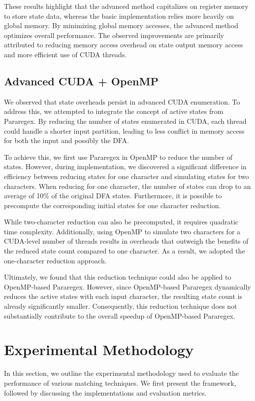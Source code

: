 \documentclass[sigconf]{acmart}
\begin{document}
These results highlight that the advanced method capitalizes on register memory to store state data, whereas the basic implementation relies more heavily on global memory. By  minimizing global memory accesses, the advanced method optimizes overall performance. The observed improvements are primarily attributed to reducing memory access overhead on state output memory access and more efficient use of CUDA threads.

\subsection{Advanced CUDA + OpenMP}
We observed that state overheads persist in advanced CUDA enumeration. To address this, we attempted to integrate the concept of active states from Pararegex\cite{pararegex}. By reducing the number of states enumerated in CUDA, each thread could handle a shorter input partition, leading to less conflict in memory access for both the input and possibly the DFA.

To achieve this, we first use Pararegex in OpenMP to reduce the number of states. However, during implementation, we discovered a significant difference in efficiency between reducing states for one character and simulating states for two characters. When reducing for one character, the number of states can drop to an average of 10\% of the original DFA states. Furthermore, it is possible to precompute the corresponding initial states for one character reduction.

While two-character reduction can also be precomputed, it requires quadratic time complexity. Additionally, using OpenMP to simulate two characters for a CUDA-level number of threads results in overheads that outweigh the benefits of the reduced state count compared to one character. As a result, we adopted the one-character reduction approach.

Ultimately, we found that this reduction technique could also be applied to OpenMP-based Pararegex. However, since OpenMP-based Pararegex dynamically reduces the active states with each input character, the resulting state count is already significantly smaller. Consequently, this reduction technique does not substantially contribute to the overall speedup of OpenMP-based Pararegex.


\section{Experimental Methodology}
In this section, we outline the experimental methodology used to evaluate the performance of various matching techniques. We first present the framework, followed by discussing the implementations and evaluation metrics.
\end{document}
